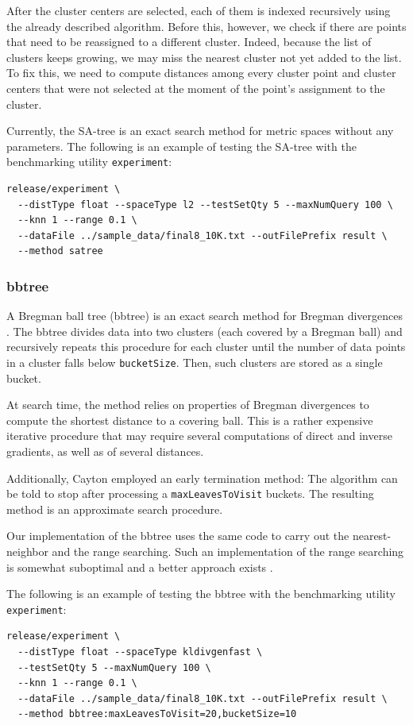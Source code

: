 \documentclass[runningheads,a4paper]{llncs}
\newcommand{\ttt}[1]{\texttt{#1}}
\begin{document}
{After the cluster centers are selected, each of them is indexed recursively using the already described
algorithm. Before this, however, we check  if there are points that need to be reassigned to a different cluster.
Indeed, because the list of clusters keeps growing, we may miss the nearest cluster not yet
added to the list. To fix this, we need  to compute distances among every cluster point
and cluster centers that were not selected at the moment of the point's assignment to the cluster.

Currently, the SA-tree is an exact search method for metric spaces without any parameters.
The following is an example of testing the SA-tree with the benchmarking utility \ttt{experiment}:
{
\footnotesize
\begin{verbatim}
release/experiment \
  --distType float --spaceType l2 --testSetQty 5 --maxNumQuery 100 \
  --knn 1 --range 0.1 \
  --dataFile ../sample_data/final8_10K.txt --outFilePrefix result \
  --method satree 
\end{verbatim}
}
 

\subsubsection{bbtree}
A Bregman ball tree (bbtree) is an exact search method for Bregman divergences \cite{Cayton2008}.
The bbtree divides data into two clusters (each covered by a Bregman ball)
and recursively repeats this procedure for each cluster until the number of data points
in a cluster falls below \ttt{bucketSize}. Then, such clusters are stored as a single bucket.

At search time, the method relies on properties of Bregman divergences 
to compute the shortest distance to a covering ball. 
This is a rather expensive iterative procedure that 
may require several computations of direct and inverse gradients,
as well as of several distances.

Additionally, Cayton  \cite{Cayton2008} employed an early termination method:
The algorithm  can be told to stop after processing
a \ttt{maxLeavesToVisit} buckets.
The resulting method is an approximate search procedure.

Our implementation of the bbtree uses the same code to carry
out the nearest-neighbor and
the range searching. 
Such an implementation of the range searching is somewhat suboptimal
and a better approach exists \cite{cayton2009efficient}.

The following is an example of testing the bbtree with the benchmarking utility \ttt{experiment}:
{
\footnotesize
\begin{verbatim}
release/experiment \
  --distType float --spaceType kldivgenfast \
  --testSetQty 5 --maxNumQuery 100 \
  --knn 1 --range 0.1 \
  --dataFile ../sample_data/final8_10K.txt --outFilePrefix result \
  --method bbtree:maxLeavesToVisit=20,bucketSize=10 
\end{verbatim}
}

}
\end{document}
